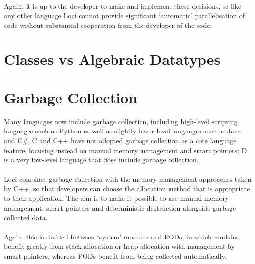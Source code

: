 \documentclass[12pt,twoside,notitlepage]{report}
\begin{document}
\paragraph{}
Again, it is up to the developer to make and implement these decisions, so like any other language Loci cannot provide significant `automatic' parallelisation of code without substantial cooperation from the developer of the code.

\section{Classes vs Algebraic Datatypes}

\paragraph{}


\section{Garbage Collection}

\paragraph{}
Many languages now include garbage collection, including high-level scripting languages such as Python as well as slightly lower-level languages such as Java and C\#. C and C++ have not adopted garbage collection as a core language feature, focusing instead on manual memory management and smart pointers; D is a very low-level language that does include garbage collection.

\paragraph{}
Loci combines garbage collection with the memory management approaches taken by C++, so that developers can choose the allocation method that is appropriate to their application. The aim is to make it possible to use manual memory management, smart pointers and deterministic destruction alongside garbage collected data.

\paragraph{}
Again, this is divided between `system' modules and PODs, in which modules benefit greatly from stack allocation or heap allocation with management by smart pointers, whereas PODs benefit from being collected automatically.
\end{document}

